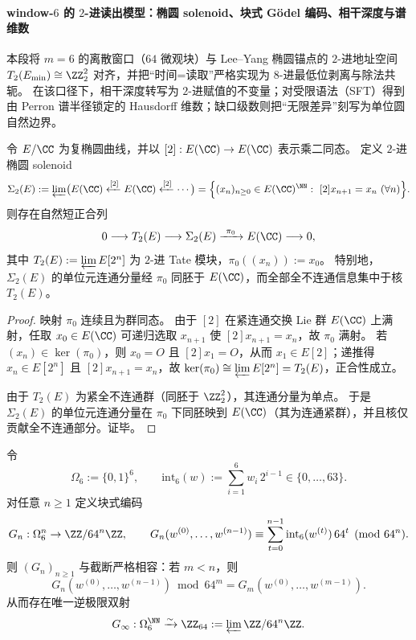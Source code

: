 \paragraph{window-\(6\) 的 \(2\)-进读出模型：椭圆 solenoid、块式 Gödel 编码、相干深度与谱维数}
本段将 \(m=6\) 的离散窗口（\(64\) 微观块）与 Lee--Yang 椭圆锚点的 \(2\)-进地址空间 \(T_2(E_{\min})\cong\ZZ_2^2\) 对齐，并把“时间=读取”严格实现为 \(8\)-进最低位剥离与除法共轭。
在该口径下，相干深度转写为 \(2\)-进赋值的不变量；对受限语法（SFT）得到由 Perron 谱半径锁定的 Hausdorff 维数；缺口级数则把“无限差异”刻写为单位圆自然边界。

\begin{theorem}\label{thm:conclusion-elliptic-2adic-solenoid-exact-sequence}
令 \(E/\CC\) 为复椭圆曲线，并以 \([2]:E(\CC)\to E(\CC)\) 表示乘二同态。
定义 \(2\)-进椭圆 solenoid
\[
\Sigma_2(E):=\varprojlim\bigl(E(\CC)\xleftarrow{[2]}E(\CC)\xleftarrow{[2]}\cdots\bigr)
=\Bigl\{(x_n)_{n\ge 0}\in E(\CC)^{\NN}:\ [2]x_{n+1}=x_n\ (\forall n)\Bigr\}.
\]
则存在自然短正合列
\[
0\longrightarrow T_2(E)\longrightarrow \Sigma_2(E)\xrightarrow{\ \pi_0\ }E(\CC)\longrightarrow 0,
\]
其中 \(T_2(E):=\varprojlim E[2^n]\) 为 \(2\)-进 Tate 模块，\(\pi_0((x_n)):=x_0\)。
特别地，\(\Sigma_2(E)\) 的单位元连通分量经 \(\pi_0\) 同胚于 \(E(\CC)\)，而全部全不连通信息集中于核 \(T_2(E)\)。
\end{theorem}

\begin{proof}
映射 \(\pi_0\) 连续且为群同态。
由于 \([2]\) 在紧连通交换 Lie 群 \(E(\CC)\) 上满射，任取 \(x_0\in E(\CC)\) 可递归选取 \(x_{n+1}\) 使 \([2]x_{n+1}=x_n\)，故 \(\pi_0\) 满射。
若 \((x_n)\in\ker(\pi_0)\)，则 \(x_0=O\) 且 \([2]x_1=O\)，从而 \(x_1\in E[2]\)；递推得 \(x_n\in E[2^n]\) 且 \([2]x_{n+1}=x_n\)，故 \(\ker(\pi_0)\cong \varprojlim E[2^n]=T_2(E)\)，正合性成立。
\par
由于 \(T_2(E)\) 为紧全不连通群（同胚于 \(\ZZ_2^2\)），其连通分量为单点。
于是 \(\Sigma_2(E)\) 的单位元连通分量在 \(\pi_0\) 下同胚映到 \(E(\CC)\)（其为连通紧群），并且核仅贡献全不连通部分。证毕。
\end{proof}

\begin{proposition}\label{prop:conclusion-window6-godel-base64-inverse-limit}
令
\[
\Omega_6:=\{0,1\}^6,\qquad
\mathrm{int}_6(w):=\sum_{i=1}^{6}w_i\,2^{i-1}\in\{0,\dots,63\}.
\]
对任意 \(n\ge 1\) 定义块式编码
\[
G_n:\Omega_6^n\to \ZZ/64^n\ZZ,\qquad
G_n(w^{(0)},\dots,w^{(n-1)})\equiv \sum_{t=0}^{n-1}\mathrm{int}_6(w^{(t)})\,64^t\pmod{64^n}.
\]
则 \((G_n)_{n\ge 1}\) 与截断严格相容：若 \(m<n\)，则
\[
G_n(w^{(0)},\dots,w^{(n-1)})\bmod 64^m=G_m(w^{(0)},\dots,w^{(m-1)}).
\]
从而存在唯一逆极限双射
\[
G_\infty:\Omega_6^{\NN}\xrightarrow{\sim}\ZZ_{64}:=\varprojlim \ZZ/64^n\ZZ.
\]
\end{proposition}

